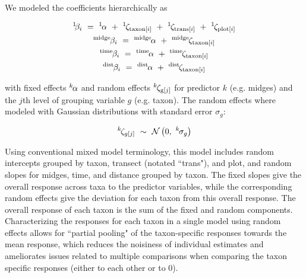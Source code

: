 {\noindent We modeled the coefficients hierarchically as

\begin{equation} \label{eq:betas}
\begin{gathered}
{}^1\hspace*{-1pt}\hspace*{-1pt}\beta_i~=~{}^1\hspace*{-1pt}\alpha~+~{}^1\hspace*{-1pt}\zeta_{\text{taxon}[i]}~+~
        {}^1\hspace*{-1pt}\zeta_{\text{trans}[i]}~+~{}^1\hspace*{-1pt}\zeta_{\text{plot}[i]} \\
{}^\text{midge}\hspace*{-1pt}\beta_i~=~{}^\text{midge}\hspace*{-1pt}\alpha~+~
        {}^\text{midge}\hspace*{-1pt}\zeta_{\text{taxon}[i]} \\
{}^\text{time}\hspace*{-1pt}\beta_i~=~{}^\text{time}\hspace*{-1pt}\alpha~+~
        {}^\text{time}\hspace*{-1pt}\zeta_{\text{taxon}[i]} \\
{}^\text{dist}\hspace*{-1pt}\beta_i~=~{}^\text{dist}\hspace*{-1pt}\alpha~+~
        {}^\text{dist}\hspace*{-1pt}\zeta_{\text{taxon}[i]}
\end{gathered}
\end{equation}

\noindent with fixed effects ${}^k\hspace*{-1pt}\alpha$ and random effects ${}^k\hspace*{-1pt}\zeta_{\text{g}[j]}$ for predictor $k$
(e.g. midges) and the $j$th level of grouping variable $g$ (e.g. taxon). The random effects where modeled with Gaussian
distributions with standard error $\sigma_g$:

\begin{equation} \label{eq:zetas}
{}^k\hspace*{-1pt}\zeta_{g[j]}~\sim~\mathcal{N}\left(0,~{}^k\hspace*{-1pt}\sigma_g\right)
\end{equation}

Using conventional mixed model terminology, this model includes random intercepts grouped by taxon, transect (notated
``trans"), and plot, and random slopes for midges, time, and distance grouped by taxon. The fixed slopes give the overall
response across taxa to the predictor variables, while the corresponding random effects give the deviation for each taxon from
this overall response. The overall response of each taxon is the sum of the fixed and random components.
Characterizing the responses for each taxon in a single model using random effects allows for ``partial pooling" of the
taxon-specific responses towards the mean response, which reduces the noisiness of individual estimates and ameliorates issues
related to multiple comparisons when comparing the taxon specific responses (either to each other or to 0).

}
